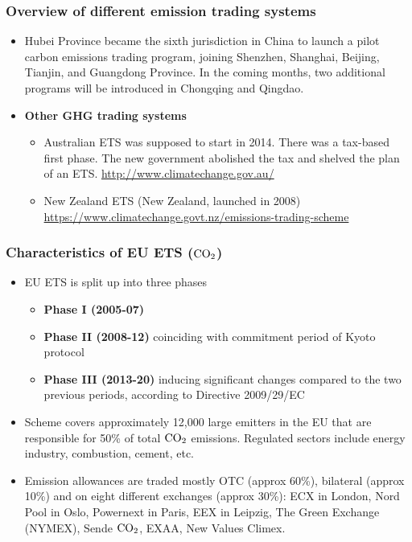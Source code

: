   \begin{frame}
  \frametitle{Overview of different emission trading systems}
  \begin{itemize}
    \item<1-> 
 Hubei Province became the sixth jurisdiction in China to launch a pilot carbon emissions trading program, joining Shenzhen, Shanghai, Beijing, Tianjin, and Guangdong Province. In the coming months, two additional programs will be introduced in Chongqing and Qingdao.

  \item<2-> \textbf{Other GHG trading systems}
        \begin{itemize}
        \item Australian ETS was supposed to start in 2014. There was a  tax-based first phase. The new government abolished the tax and shelved the plan of an ETS.
        \url{http://www.climatechange.gov.au/}
        \item New Zealand ETS (New Zealand, launched in 2008)
        \url{https://www.climatechange.govt.nz/emissions-trading-scheme}
        \end{itemize}
   \end{itemize}
\end{frame}

\begin{frame}
  \frametitle{Characteristics of EU ETS ($\textnormal{CO}_2$)}
  \begin{itemize}
  \item<1-> EU ETS is split up into three phases
  \begin{itemize}
  \item \textbf{Phase I (2005-07)}
  \item \textbf{Phase II (2008-12)} coinciding with commitment period of Kyoto protocol
  \item \textbf{Phase III (2013-20)} inducing significant changes compared to the two previous periods, according to Directive 2009/29/EC
  \end{itemize}
  \item<2-> Scheme covers approximately 12,000 large emitters in the EU that are responsible for 50\% of total $\textnormal{CO}_2$ emissions. Regulated sectors include energy industry, combustion, cement, etc.
  \item<3->  Emission allowances are traded mostly OTC (approx 60\%), bilateral (approx 10\%) and on eight different exchanges (approx 30\%):
  ECX in London, Nord Pool in Oslo, Powernext in Paris, EEX in Leipzig, The Green Exchange (NYMEX), Sende $\textnormal{CO}_2$, EXAA, New Values Climex.
  \end{itemize}
  \end{frame}

